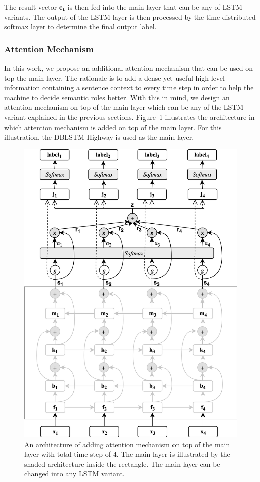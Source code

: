 The result vector $\mathbf{c_{t}}$ is then fed into the main layer that can be any of LSTM variants. The output of the LSTM layer is then processed by the time-distributed softmax layer to determine the final output label.

\subsubsection{Attention Mechanism}
In this work, we propose an additional attention mechanism that can be used on top the main layer. The rationale is to add a dense yet useful high-level information containing a sentence context to every time step in order to help the machine to decide semantic roles better. With this in mind, we design an attention mechanism on top of the main layer which can be any of the LSTM variant explained in the previous sections. Figure~\ref{fig:dblstmhighwayattention} illustrates the architecture in which attention mechanism is added on top of the main layer. For this illustration, the DBLSTM-Highway is used as the main layer.

\begin{figure}
	\centering
	\includegraphics[width=0.75\linewidth]{images/BLSTMAttentionNew}
	\caption{An architecture of adding attention mechanism on top of the main layer with total time step of 4. The main layer is illustrated by the shaded architecture inside the rectangle. The main layer can be changed into any LSTM variant.}
	\label{fig:dblstmhighwayattention}
\end{figure}

